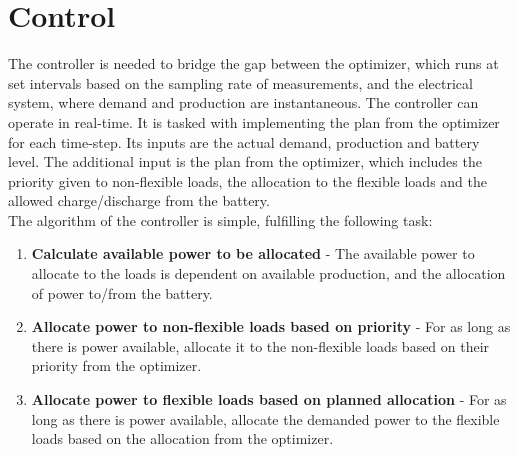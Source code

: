 \section{Control}\label{sec:controller}

The controller is needed to bridge the gap between the optimizer, which runs at set intervals based on the sampling rate of measurements, and the electrical system, where demand and production are instantaneous. The controller can operate in real-time. It is tasked with implementing the plan from the optimizer for each time-step. Its inputs are the actual demand, production and battery level. The additional input is the plan from the optimizer, which includes the priority given to non-flexible loads, the allocation to the flexible loads and the allowed charge/discharge from the battery. \\

The algorithm of the controller is simple, fulfilling the following task:
\begin{enumerate}
    \item \textbf{Calculate available power to be allocated}    -   The available power to allocate to the loads is dependent on available production, and the allocation of power to/from the battery.
    \item \textbf{Allocate power to non-flexible loads based on priority}   -   For as long as there is power available, allocate it to the non-flexible loads based on their priority from the optimizer. 
    \item \textbf{Allocate power to flexible loads based on planned allocation} -   For as long as there is power available, allocate the demanded power to the flexible loads based on the allocation from the optimizer. 
\end{enumerate}



